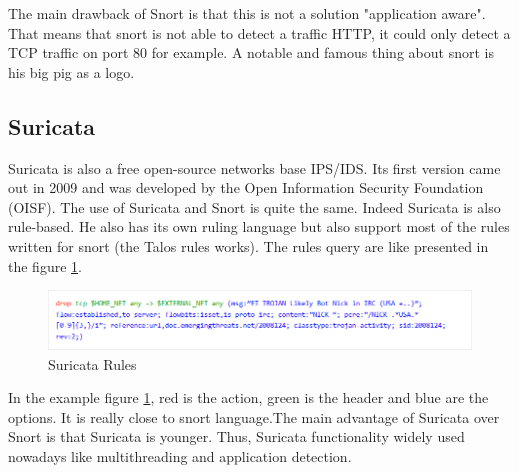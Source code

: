 \documentclass{tnreport}
\begin{document}
The main drawback of Snort is that this is not a solution "application aware". That means that snort is not able to detect a traffic HTTP, it could only detect a TCP traffic on port 80 for example. 
A notable and famous thing about snort is his big pig as a logo.

\subsection{Suricata}
Suricata is also a free open-source networks base \gls{IPS}/\gls{IDS}. Its first version came out in 2009 and was developed by the Open Information Security Foundation (OISF). The use of Suricata and Snort is  quite the same. Indeed Suricata is also rule-based. He also has its own ruling language but also support most of the rules written for snort (the Talos rules works).
The rules query are like presented in the figure \ref{suricata}.

\begin{figure}[h!]
  \begin{center}
  \includegraphics[scale=1]{figures/regles_suricata}
  \caption{Suricata Rules}
  \label{suricata}
  \end{center}
\end{figure}
In the example figure \ref{suricata}, red is the action, green is the header and blue are the options. It is really close to snort language.\eol The main advantage of Suricata over Snort is that Suricata is younger. Thus, Suricata functionality widely used nowadays like multithreading and application detection. 
\end{document}
